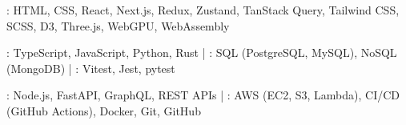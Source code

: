 : HTML, CSS, React, Next.js, Redux, Zustand, TanStack Query, Tailwind CSS, SCSS, D3, Three.js, WebGPU, WebAssembly\par
{}: TypeScript, JavaScript, Python, Rust | : SQL (PostgreSQL, MySQL), NoSQL (MongoDB) | : Vitest, Jest, pytest\par
{}: Node.js, FastAPI, GraphQL, REST APIs | : AWS (EC2, S3, Lambda), CI/CD (GitHub Actions), Docker, Git, GitHub\par
